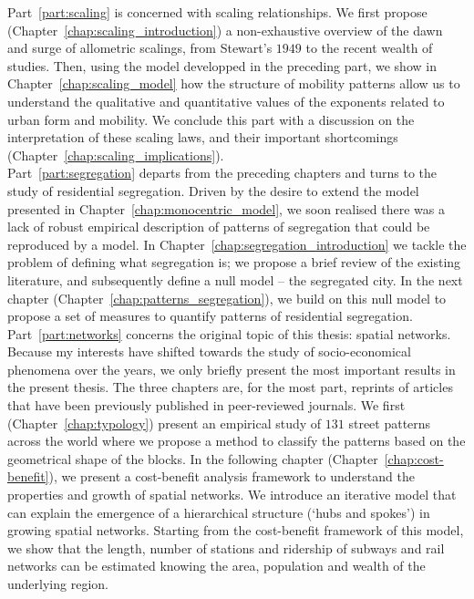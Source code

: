 Part~\ref{part:scaling} is concerned with scaling relationships. We first propose
(Chapter~\ref{chap:scaling_introduction}) a non-exhaustive overview of the dawn
and surge of allometric scalings, from Stewart's $1949$ to the recent wealth of
studies. Then, using the model developped in the preceding part, we show in
Chapter~\ref{chap:scaling_model} how the structure of mobility patterns allow us
to understand the qualitative and quantitative values of the exponents related
to urban form and mobility. We conclude this part with a discussion on the
interpretation of these scaling laws, and their important shortcomings
(Chapter~\ref{chap:scaling_implications}).\\

Part~\ref{part:segregation} departs from the preceding chapters and turns to the
study of residential segregation. Driven by the desire to extend the model
presented in Chapter~\ref{chap:monocentric_model}, we soon realised there was a
lack of robust empirical description of patterns of segregation that could be
reproduced by a model. In Chapter~\ref{chap:segregation_introduction} we tackle
the problem of defining what segregation is; we propose a brief review of the
existing literature, and subsequently define a null model -- the segregated
city. In the next chapter (Chapter~\ref{chap:patterns_segregation}), we build on
this null model to propose a set of measures to quantify patterns of residential
segregation.\\

Part~\ref{part:networks} concerns the original topic of this thesis: spatial
networks. Because my interests have shifted towards the study of
socio-economical phenomena over the years, we only briefly present the most
important results in the present thesis. The three chapters are, for the most
part, reprints of articles that have been previously published in peer-reviewed
journals. We first (Chapter~\ref{chap:typology}) present an empirical study of
$131$ street patterns across the world where we propose a method to classify the
patterns based on the geometrical shape of the blocks. In the following chapter
(Chapter~\ref{chap:cost-benefit}), we present a cost-benefit analysis framework
to understand the properties and growth of spatial networks.  We introduce an
iterative model that can explain the emergence of a hierarchical structure
(`hubs and spokes') in growing spatial networks. Starting from the cost-benefit
framework of this model, we show that the length, number of stations and
ridership of subways and rail networks can be estimated knowing the area,
population and wealth of the underlying region.\\

